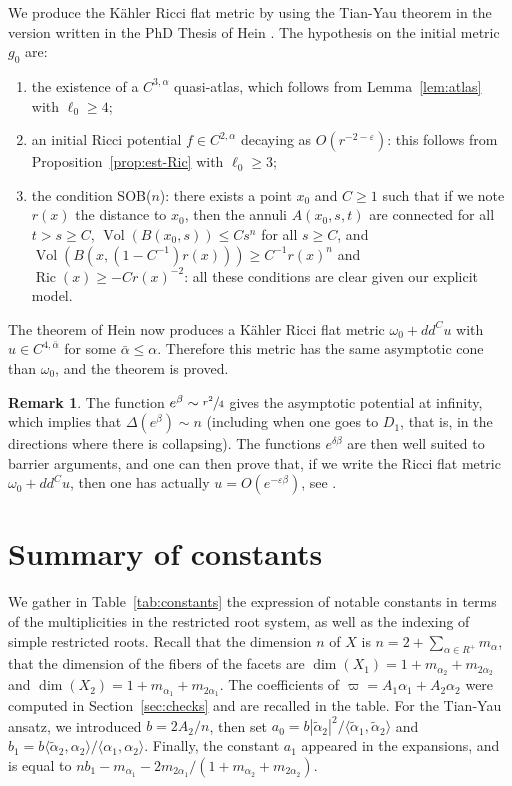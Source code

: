 \documentclass[JEP,XML,SOM,Unicode, NoEqCountersInSection, NoFloatCountersInSection]{cedram}
\theoremstyle{plain}
\theoremstyle{definition}
\newtheorem{rem}[thm]{Remark}
\DeclareMathOperator{\Ric}{Ric}
\DeclareMathOperator{\Vol}{Vol}
\newcommand{\ta}{\tilde \alpha}
\newcommand{\rRoots}{R}
\begin{document}
We produce the Kähler Ricci flat metric by using the Tian-Yau theorem \cite{TiaYau91} in the version written in the PhD Thesis of Hein \cite[Prop.\,4.1]{Hei10}. The hypothesis on the initial metric $g_0$ are:
\begin{enumerate}
\item the existence of a $C^{3,\alpha}$ quasi-atlas, which follows from Lemma~\ref{lem:atlas} with $\ell_0\geq4$;
\item an initial Ricci potential $f\in C^{2,\alpha}$ decaying as $O(r^{-2-\varepsilon})$: this follows from Proposition~\ref{prop:est-Ric} with $\ell_0\geq 3$;
\item the condition SOB($n$): there exists a point $x_0$ and $C\geq 1$ such that if we note $r(x)$ the distance to $x_0$, then the annuli $A(x_0,s,t)$ are connected for all $t>s\geq C$, $\Vol(B(x_0,s))\leq Cs^n$ for all $s\geq C$, and $\Vol(B(x,(1-C^{-1})r(x))) \geq C^{-1} r(x)^n$ and $\Ric(x)\geq -Cr(x)^{-2}$: all these conditions are clear given our explicit model.
\end{enumerate}
The theorem of Hein now produces a Kähler Ricci flat metric $\omega_0+dd^Cu$ with $u\in C^{4,\bar \alpha}$ for some $\bar \alpha\leq \alpha$. Therefore this metric has the same asymptotic cone than $\omega_0$, and the theorem is proved.

\begin{rem}
The function $e^\beta\sim \sfrac{r^2}4$ gives the asymptotic potential at infinity, which implies that $\Delta(e^\beta) \sim n$ (including when one goes to $D_1$, that is, in the directions where there is collapsing). The functions $e^{\delta \beta}$ are then well suited to barrier arguments, and one can then prove that, if we write the Ricci flat metric $\omega_0+dd^Cu$, then one has actually $u=O(e^{-\varepsilon\beta})$, see \cite[\S4.5]{Hei10}.
\end{rem}

\section{Summary of constants}
\label{sec:summary-constants}
We gather in Table~\ref{tab:constants} the expression of notable constants in terms of the multiplicities
in the restricted root system, as well as the indexing of simple restricted roots.
Recall that the dimension $n$ of $X$ is $n=2+\sum_{\alpha\in\rRoots^+} m_{\alpha}$,
that the dimension of the fibers of the facets are
$\dim(X_1)=1+m_{\alpha_2}+m_{2\alpha_2}$ and
$\dim(X_2)=1+m_{\alpha_1}+m_{2\alpha_1}$.
The coefficients of $\varpi=A_1\alpha_1+A_2\alpha_2$ were computed in
Section~\ref{sec:checks} and are recalled in the table.
For the Tian-Yau ansatz, we introduced $b=2A_2/n$, then
set $a_0=b |\ta_2|^2/\langle \ta_1,\ta_2 \rangle$
and $b_1=b \langle \ta_2,\alpha_2\rangle / \langle \alpha_1,\alpha_2\rangle$.
Finally, the constant $a_1$ appeared in the expansions,
and is equal to
$nb_1-m_{\alpha_1}-2m_{2\alpha_1}/(1+m_{\alpha_2}+m_{2\alpha_2})$.
\end{document}
